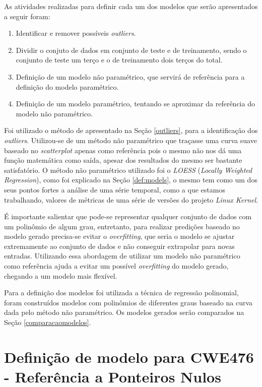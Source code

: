 As atividades realizadas para definir cada um dos modelos que serão apresentados a
seguir foram:

\begin{enumerate}
 \item Identificar e remover possíveis \textit{outliers}.
 \item Dividir o conjuto de dados em conjunto de teste e de treinamento, sendo o
  conjunto de teste um terço e o de treinamento dois terços do total.
 \item Definição de um modelo não paramétrico, que servirá de referência para a
  definição do modelo paramétrico.
 \item Definição de um modelo paramétrico, tentando se aproximar da referência
  do modelo não paramétrico.
\end{enumerate}

Foi utilizado o método de  apresentado na Seção
\ref{outliers}, para a identificação dos \textit{outliers}. Utilizou-se de um
método não paramétrico que traçasse uma curva suave baseado no
\textit{scatterplot} apenas como referência pois o mesmo não nos dá uma função
matemática como saída, apesar dos resultados do mesmo ser bastante satisfatório.
O método não paramétrico utilizado foi o \textit{LOESS} (\textit{Locally
 Weighted Regression}), como foi explicado na Seção \ref{def:models}, o mesmo tem
 como um dos seus pontos fortes a análise de uma série temporal, como a que
 estamos trabalhando, valores de métricas de uma série de versões do projeto
 \textit{Linux Kernel}.
 
 É importante salientar que pode-se representar qualquer conjunto de dados com
 um polinômio de algum grau, entretanto, para realizar predições baseado no
 modelo gerado precisa-se evitar o \textit{overfitting}, que seria o modelo se
 ajustar extremamente ao conjunto de dados e não conseguir extrapolar para novas
 entradas. Utilizando essa abordagem de utilizar um modelo não paramétrico como
 referência ajuda a evitar um possível \textit{overfitting} do modelo gerado,
 chegando a um modelo mais flexível.

Para a definição dos modelos foi utilizada a técnica de regressão polinomial,
foram construídos modelos com polinômios de diferentes graus baseado na curva
dada pelo método não paramétrico. Os modelos gerados serão comparados na Seção
\ref{comparacaomodelos}.

\section{Definição de modelo para CWE476 - Referência a Ponteiros Nulos}

